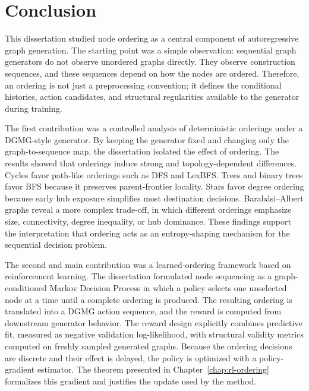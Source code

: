 \chapter{Conclusion}
\label{chap:conclusion}

This dissertation studied node ordering as a central component of autoregressive graph generation. The starting point was a simple observation: sequential graph generators do not observe unordered graphs directly. They observe construction sequences, and these sequences depend on how the nodes are ordered. Therefore, an ordering is not just a preprocessing convention; it defines the conditional histories, action candidates, and structural regularities available to the generator during training.

The first contribution was a controlled analysis of deterministic orderings under a DGMG-style generator. By keeping the generator fixed and changing only the graph-to-sequence map, the dissertation isolated the effect of ordering. The results showed that orderings induce strong and topology-dependent differences. Cycles favor path-like orderings such as DFS and LexBFS. Trees and binary trees favor BFS because it preserves parent-frontier locality. Stars favor degree ordering because early hub exposure simplifies most destination decisions. Barab\'asi--Albert graphs reveal a more complex trade-off, in which different orderings emphasize size, connectivity, degree inequality, or hub dominance. These findings support the interpretation that ordering acts as an entropy-shaping mechanism for the sequential decision problem.

The second and main contribution was a learned-ordering framework based on reinforcement learning. The dissertation formulated node sequencing as a graph-conditioned Markov Decision Process in which a policy selects one unselected node at a time until a complete ordering is produced. The resulting ordering is translated into a DGMG action sequence, and the reward is computed from downstream generator behavior. The reward design explicitly combines predictive fit, measured as negative validation log-likelihood, with structural validity metrics computed on freshly sampled generated graphs. Because the ordering decisions are discrete and their effect is delayed, the policy is optimized with a policy-gradient estimator. The theorem presented in Chapter~\ref{chap:rl-ordering} formalizes this gradient and justifies the update used by the method.

